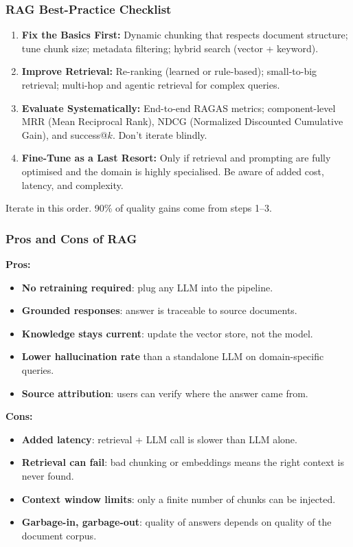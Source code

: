 \begin{frame}[fragile]\frametitle{RAG Best-Practice Checklist}
\begin{enumerate}
  \item \textbf{Fix the Basics First:} Dynamic chunking that respects document structure; tune chunk size; metadata filtering; hybrid search (vector + keyword).
  \item \textbf{Improve Retrieval:} Re-ranking (learned or rule-based); small-to-big retrieval; multi-hop and agentic retrieval for complex queries.
  \item \textbf{Evaluate Systematically:} End-to-end RAGAS metrics; component-level MRR (Mean Reciprocal Rank), NDCG (Normalized Discounted Cumulative Gain), and success@$k$. Don't iterate blindly.
  \item \textbf{Fine-Tune as a Last Resort:} Only if retrieval and prompting are fully optimised and the domain is highly specialised. Be aware of added cost, latency, and complexity.
\end{enumerate}
\vspace{0.3em}
{\small Iterate in this order. 90\% of quality gains come from steps 1--3.}
\end{frame}



\begin{frame}[fragile]\frametitle{Pros and Cons of RAG}

\textbf{Pros:}
\begin{itemize}
\item \textbf{No retraining required}: plug any LLM into the pipeline.
\item \textbf{Grounded responses}: answer is traceable to source documents.
\item \textbf{Knowledge stays current}: update the vector store, not the model.
\item \textbf{Lower hallucination rate} than a standalone LLM on domain-specific queries.
\item \textbf{Source attribution}: users can verify where the answer came from.
\end{itemize}

\textbf{Cons:}
\begin{itemize}
\item \textbf{Added latency}: retrieval + LLM call is slower than LLM alone.
\item \textbf{Retrieval can fail}: bad chunking or embeddings means the right context is never found.
\item \textbf{Context window limits}: only a finite number of chunks can be injected.
\item \textbf{Garbage-in, garbage-out}: quality of answers depends on quality of the document corpus.
\end{itemize}

\end{frame}

